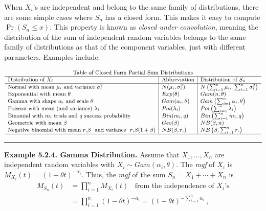 \documentclass[]{book}
\theoremstyle{definition}
\theoremstyle{definition}
\theoremstyle{definition}
\theoremstyle{remark}
\begin{document}
When \(X_i\)'s are independent and belong to the same family of
distributions, there are some simple cases where \(S_n\) has a closed
form. This makes it easy to compute \(\Pr(S_n \le x)\). This property is
known as \emph{closed under convolution}, meaning the distribution of
the sum of independent random variables belongs to the same family of
distributions as that of the component variables, just with different
parameters. Examples include:

\[
{\small
\begin{matrix}
\text{Table of Closed Form Partial Sum Distributions}\\
    \begin{array}{l|l|l} \hline
        \text{Distribution of } X_i & \text{Abbreviation} & \text{Distribution of } S_n   \\ \hline
\text{Normal with mean } \mu_i \text{ and variance } \sigma_i^2 & N(\mu_i,\sigma_i^2) & N\left(\sum_{i=1}^{n}\mu_i,~\sum_{i=1}^{n}\sigma_i^2\right) \\
\text{Exponential with mean } \theta & Exp(\theta) & Gam(n,\theta)\\  
\text{Gamma with shape } \alpha_i \text{ and scale } \theta & Gam(\alpha_i,\theta) & Gam\left(\sum_{i=1}^n\alpha_i,\theta\right) \\  
\text{Poisson with mean (and variance) } \lambda_i  & Poi(\lambda_i)& Poi\left(\sum_{i=1}^{n}\lambda_i\right)\\  
\text{Binomial with } m_i \text{ trials and } q \text{ success probability} & Bin(m_i, q)& Bin\left(\sum_{i=1}^n m_i, q\right)\\  
\text{Geometric with mean } \beta & Geo(\beta) & NB(\beta,n)\\  
\text{Negative binomial with mean } r_i \beta~ \text{ and variance } ~r_i \beta (1+\beta) & NB(\beta,r_i)& NB\left(\beta,\sum_{i=1}^n r_i\right)\\  
\hline
    \end{array}
\end{matrix}
}
\]

\begin{center}\rule{0.5\linewidth}{\linethickness}\end{center}

\textbf{Example 5.2.4. Gamma Distribution.} Assume that
\(X_1,\ldots,X_n\) are independent random variables with
\(X_i \sim Gam(\alpha_i, \theta)\). The \emph{mgf} of \(X_i\) is
\(M_{X_i}(t) = (1 - \theta t)^{- \alpha_i}\). Thus, the \emph{mgf} of
the sum \(S_n = X_1 + \cdots + X_n\) is \[\begin{aligned}
M_{S_n}(t) &= \prod_{i=1}^n M_{X_i}(t) ~~~~ \text{from the independence of } X_i \text{'s} \\
&= \prod_{i=1}^n (1 - \theta t)^{- \alpha_i} = (1-\theta t)^{-\sum_{i=1}^n \alpha_i }~ ,
\end{aligned}\]
\end{document}
